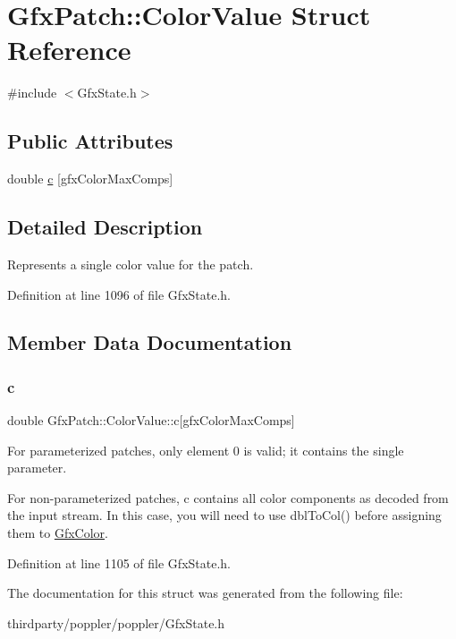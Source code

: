 \hypertarget{struct_gfx_patch_1_1_color_value}{}\section{Gfx\+Patch\+:\+:Color\+Value Struct Reference}
\label{struct_gfx_patch_1_1_color_value}


{\ttfamily \#include $<$Gfx\+State.\+h$>$}

\subsection*{Public Attributes}
\begin{DoxyCompactItemize}
\item 
double \hyperlink{struct_gfx_patch_1_1_color_value_ad69e7f7186b9be22d716d1c6b96c416b}{c} \mbox{[}gfx\+Color\+Max\+Comps\mbox{]}
\end{DoxyCompactItemize}


\subsection{Detailed Description}
Represents a single color value for the patch. 

Definition at line 1096 of file Gfx\+State.\+h.



\subsection{Member Data Documentation}
\mbox{\label{struct_gfx_patch_1_1_color_value_ad69e7f7186b9be22d716d1c6b96c416b}} 
\subsubsection{\texorpdfstring{c}{c}}
{\footnotesize\ttfamily double Gfx\+Patch\+::\+Color\+Value\+::c\mbox{[}gfx\+Color\+Max\+Comps\mbox{]}}

For parameterized patches, only element 0 is valid; it contains the single parameter.

For non-\/parameterized patches, c contains all color components as decoded from the input stream. In this case, you will need to use dbl\+To\+Col() before assigning them to \hyperlink{struct_gfx_color}{Gfx\+Color}. 

Definition at line 1105 of file Gfx\+State.\+h.



The documentation for this struct was generated from the following file\+:\begin{DoxyCompactItemize}
\item 
thirdparty/poppler/poppler/Gfx\+State.\+h\end{DoxyCompactItemize}
